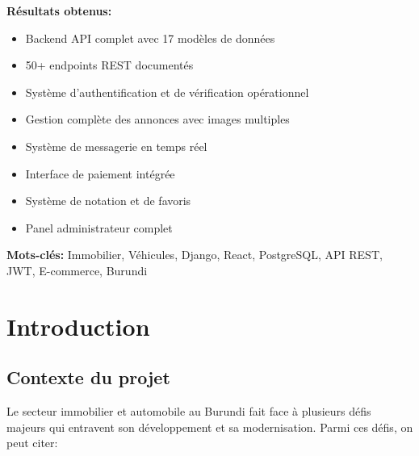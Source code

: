\documentclass[12pt,a4paper]{report}
\begin{document}
\vspace{0.5cm}

\textbf{Résultats obtenus:}
\begin{itemize}[noitemsep]
    \item Backend API complet avec 17 modèles de données
    \item 50+ endpoints REST documentés
    \item Système d'authentification et de vérification opérationnel
    \item Gestion complète des annonces avec images multiples
    \item Système de messagerie en temps réel
    \item Interface de paiement intégrée
    \item Système de notation et de favoris
    \item Panel administrateur complet
\end{itemize}

\vspace{0.5cm}

\textbf{Mots-clés:} Immobilier, Véhicules, Django, React, PostgreSQL, API REST, JWT, E-commerce, Burundi

\newpage

\tableofcontents
\newpage

\listoffigures
\newpage

\listoftables
\newpage

\chapter{Introduction}

\section{Contexte du projet}

Le secteur immobilier et automobile au Burundi fait face à plusieurs défis majeurs qui entravent son développement et sa modernisation. Parmi ces défis, on peut citer:
\end{document}
